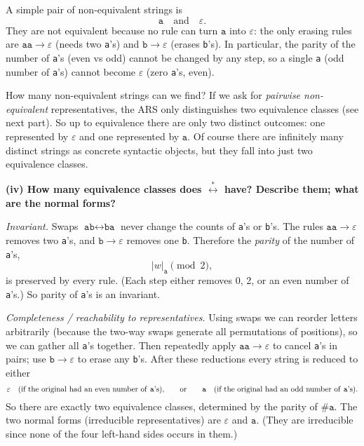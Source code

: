 \documentclass[12pt]{article}
\begin{document}
A simple pair of non-equivalent strings is
\[
\texttt{a}\quad\text{and}\quad\varepsilon.
\]
They are not equivalent because no rule can turn \(\texttt{a}\) into \(\varepsilon\): the only erasing rules are \(\texttt{aa}\to\varepsilon\) (needs two \texttt{a}'s) and \(\texttt{b}\to\varepsilon\) (erases \texttt{b}'s). In particular, the parity of the number of \texttt{a}'s (even vs odd) cannot be changed by any step, so a single \texttt{a} (odd number of \texttt{a}'s) cannot become \(\varepsilon\) (zero \texttt{a}'s, even).

How many non-equivalent strings can we find? If we ask for \emph{pairwise non-equivalent} representatives, the ARS only distinguishes two equivalence classes (see next part). So up to equivalence there are only two distinct outcomes: one represented by \(\varepsilon\) and one represented by \(\texttt{a}\). Of course there are infinitely many distinct strings as concrete syntactic objects, but they fall into just two equivalence classes.

\bigskip

\textbf{(iv) How many equivalence classes does \(\stackrel{*}{\longleftrightarrow}\) have? Describe them; what are the normal forms?}

\emph{Invariant.} Swaps \(\texttt{ab}\leftrightarrow\texttt{ba}\) never change the counts of \texttt{a}'s or \texttt{b}'s. The rules \(\texttt{aa}\to\varepsilon\) removes two \texttt{a}'s, and \(\texttt{b}\to\varepsilon\) removes one \texttt{b}. Therefore the \emph{parity} of the number of \texttt{a}'s,
\[
|w|_{\texttt{a}}\pmod{2},
\]
is preserved by every rule. (Each step either removes 0, 2, or an even number of \texttt{a}'s.) So parity of \texttt{a}'s is an invariant.

\emph{Completeness / reachability to representatives.} Using swaps we can reorder letters arbitrarily (because the two-way swaps generate all permutations of positions), so we can gather all \texttt{a}'s together. Then repeatedly apply \(\texttt{aa}\to\varepsilon\) to cancel \texttt{a}'s in pairs; use \(\texttt{b}\to\varepsilon\) to erase any \texttt{b}'s. After these reductions every string is reduced to either
\[
\varepsilon \quad\text{(if the original had an even number of \texttt{a}'s),}
\qquad\text{or}\qquad
\texttt{a} \quad\text{(if the original had an odd number of \texttt{a}'s).}
\]
So there are exactly two equivalence classes, determined by the parity of \(\#\texttt{a}\). The two normal forms (irreducible representatives) are \(\varepsilon\) and \(\texttt{a}\). (They are irreducible since none of the four left-hand sides occurs in them.)
\end{document}
